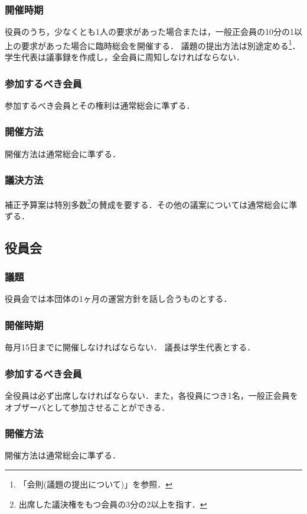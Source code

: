 \documentclass{ltjsarticle}
\begin{document}
      \subsubsection{開催時期}
        \jor
        役員のうち，少なくとも1人の要求があった場合または，一般正会員の10分の1以上の要求があった場合に臨時総会を開催する．
        議題の提出方法は別途定める\footnote{「会則(議題の提出について)」を参照．}．
        学生代表は議事録を作成し，全会員に周知しなければならない．
      \subsubsection{参加するべき会員}
        \jor
        参加するべき会員とその権利は通常総会に準ずる．
      \subsubsection{開催方法}
        \jor
        開催方法は通常総会に準ずる．
      \subsubsection{議決方法}
        \jor
        補正予算案は特別多数\footnote{出席した議決権をもつ会員の3分の2以上を指す．}の賛成を要する．その他の議案については通常総会に準ずる．
    \subsection{役員会}
      \subsubsection{議題}
        \jor
        役員会では本団体の1ヶ月の運営方針を話し合うものとする．
      \subsubsection{開催時期}
        \jor
        毎月15日までに開催しなければならない．
        議長は学生代表とする．
      \subsubsection{参加するべき会員}
        \jor
        全役員は必ず出席しなければならない．また，各役員につき1名，一般正会員をオブザーバとして参加させることができる．
      \subsubsection{開催方法}
        \jor
        開催方法は通常総会に準ずる．
\end{document}
